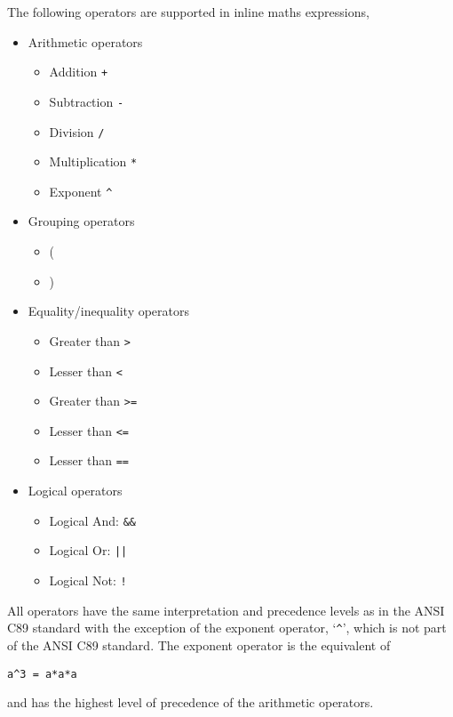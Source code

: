\documentclass[draftspec]{ninemlspec}
\begin{document}
The following operators are supported in inline maths expressions,
\begin{itemize}
\item Arithmetic operators
\begin{itemize}
\item Addition \verb|+|
\item Subtraction \verb|-|
\item Division \verb|/|
\item Multiplication \verb|*|
\item Exponent \verb|^|
\end{itemize}

\item Grouping operators
\begin{itemize}
\item (
\item )
\end{itemize}

\item Equality/inequality operators
\begin{itemize}
\item Greater than \verb|>|
\item Lesser than \verb|<|
\item Greater than \verb|>=|
\item Lesser than \verb|<=|
\item Lesser than \verb|==|
\end{itemize}

\item Logical operators
\begin{itemize}
\item Logical And: \verb|&&|
\item Logical Or:  \verb+||+
\item Logical Not: \verb|!|
\end{itemize}

\end{itemize}
All operators have the same interpretation and precedence levels as in the ANSI C89 standard with the exception of the exponent operator, `\verb|^|', which is not part of the ANSI C89 standard. The exponent operator is the equivalent of
 \begin{lstlisting}
a^3 = a*a*a
\end{lstlisting}
and has the highest level of precedence of the arithmetic operators.
\end{document}

